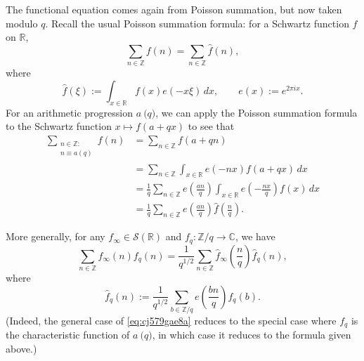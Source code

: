\documentclass[reqno]{amsart}  \numberwithin{theorem}{section} \numberwithin{equation}{section}
\begin{document}
The functional equation comes again from Poisson summation, but now taken modulo $q$.  Recall the usual Poisson summation formula: for a Schwartz function $f$ on $\mathbb{R}$,
\begin{equation*}
\sum_{n \in \mathbb{Z} } f (n) = \sum_{n \in \mathbb{Z} } \hat{f} (n),
\end{equation*}
where
\begin{equation*}
  \hat{f} (\xi ) := \int_{x \in \mathbb{R} } f (x) e (- x \xi ) \, d x,
  \qquad
  e(x) := e^{2 \pi i x}.
\end{equation*}
For an arithmetic progression $a \pod {q}$, we can apply the Poisson summation formula to the Schwartz function $x \mapsto f (a + q x)$ to see that
\begin{align*}
  \sum_{
  \substack{
  n \in \mathbb{Z} :  \\
  n \equiv a (q)
  }
  }
  f (n)
  &=
    \sum_{n \in \mathbb{Z} } f (a + q n)
  \\
  &= \sum_{n \in \mathbb{Z} } \int_{x \in \mathbb{R} } e (- n x ) f (a + q x) \, d x \\
  &= \frac{1}{q} \sum_{n \in \mathbb{Z} }
    e \left( \frac{a n }{q} \right)
    \int_{x \in \mathbb{R} } e \left(- \frac{n x}{q} \right) f (x) \, d x   \\
  &= \frac{1}{q} \sum_{n \in \mathbb{Z} }
    e \left( \frac{a n }{q} \right)
    \hat{f} \left( \frac{n}{q} \right).
\end{align*}


More generally, for any $f _\infty \in \mathcal{S} (\mathbb{R} )$ and $f_q : \mathbb{Z} / q \rightarrow \mathbb{C} $, we have
\begin{equation}\label{eq:cj579gae8a}
  \sum_{n \in \mathbb{Z} } f _\infty (n) f_q (n)
  = \frac{1}{q^{1/2} } \sum_{n \in \mathbb{Z} } \hat{f} _\infty \left( \frac{n}{q} \right) \hat{f}_q (n),
\end{equation}
where
\begin{equation*}
\hat{f}_q (n) := \frac{1}{ q^{1/2} } \sum_{b \in \mathbb{Z} / q} e \left( \frac{b n}{q} \right) f_q (b).
\end{equation*}
(Indeed, the general case of \eqref{eq:cj579gae8a} reduces to the special case where $f_q$ is the characteristic function of $a \pod{q}$, in which case it reduces to the formula given above.)
\end{document}
